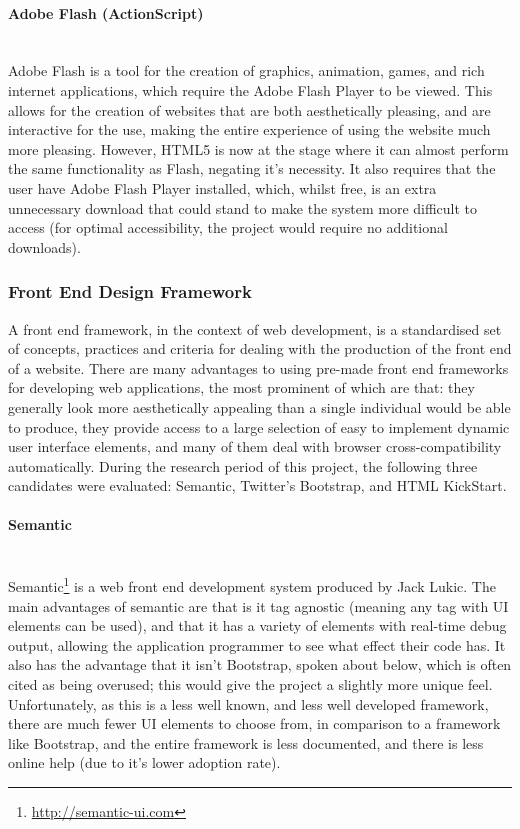 \paragraph{Adobe Flash (ActionScript)}\ \\
Adobe Flash is a tool for the creation of graphics, animation, games, and rich internet applications, which require the Adobe Flash Player to be viewed. This allows for the creation of websites that are both aesthetically pleasing, and are interactive for the use, making the entire experience of using the website much more pleasing. However, HTML5 is now at the stage where it can almost perform the same functionality as Flash, negating it's necessity. It also requires that the user have Adobe Flash Player installed, which, whilst free, is an extra unnecessary download that could stand to make the system more difficult to access (for optimal accessibility, the project would require no additional downloads).

\subsubsection{Front End Design Framework}
A front end framework, in the context of web development, is a standardised set of concepts, practices and criteria for dealing with the production of the front end of a website. There are many advantages to using pre-made front end frameworks for developing web applications, the most prominent of which are that: they generally look more aesthetically appealing than a single individual would be able to produce, they provide access to a large selection of easy to implement dynamic user interface elements, and many of them deal with browser cross-compatibility automatically. During the research period of this project, the following three candidates were evaluated: Semantic, Twitter's Bootstrap, and HTML KickStart.

\paragraph{Semantic}\ \\
Semantic\footnote{\url{http://semantic-ui.com}} is a web front end development system produced by Jack Lukic. The main advantages of semantic are that is it tag agnostic (meaning any tag with UI elements can be used), and that it has a variety of elements with real-time debug output, allowing the application programmer to see what effect their code has. It also has the advantage that it isn't Bootstrap, spoken about below, which is often cited as being overused; this would give the project a slightly more unique feel. Unfortunately, as this is a less well known, and less well developed framework, there are much fewer UI elements to choose from, in comparison to a framework like Bootstrap, and the entire framework is less documented, and there is less online help (due to it's lower adoption rate).

